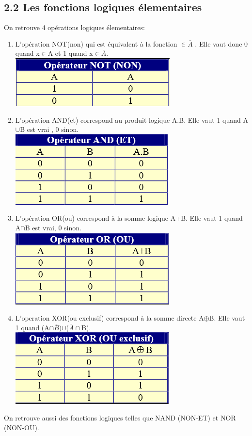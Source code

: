 \documentclass{report}
\begin{document}
\subsection*{2.2 Les fonctions logiques \'elementaires}
On retrouve 4 op\'erations logiques \'elementaires:
\begin{enumerate}
\item L'op\'eration NOT(non) qui est \'equivalent \`a la fonction $ \in\overline{A}$ . Elle vaut donc 0 quand x$\in$A et 1 quand x$\in\overline{A}$.\\
\includegraphics[scale=1]{not.png} 

\newpage

\item L'op\'eration AND(et) correspond au produit logique A.B. Elle vaut 1 quand A$\cup$B est vrai , 0 sinon.\\
\includegraphics[scale=1]{and.png} 
\item L'op\'eration OR(ou) correspond \`a la somme logique A+B. Elle vaut 1 quand A$\cap$B est vrai, 0 sinon.\\
\includegraphics[scale=1]{or.png} 
\item L'operation XOR(ou exclusif) correspond \`a la somme directe A$\oplus$B. Elle vaut 1 quand (A$\cap\overline{B}$)$\cup$($\overline{A}\cap$B).\\
\includegraphics[scale=1]{xor.png} 
\end{enumerate}
On retrouve aussi des fonctions logiques telles que NAND (NON-ET) et NOR (NON-OU).
\newpage
\end{document}
